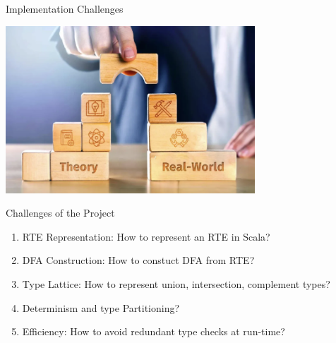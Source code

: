 {  
  \begin{frame}{Implementation Challenges}
      
  \centering
  \includegraphics[width=0.7\textwidth]{theoretic-challenge.png}
\end{frame}
}

\begin{frame}{Challenges of the Project}
  \begin{enumerate}
  \item RTE Representation:   How to represent an RTE in Scala?
  \item DFA Construction:  How to constuct DFA from RTE?
  \item Type Lattice: How to represent union, intersection, complement types?
  \item Determinism and type Partitioning?
  \item Efficiency:  How to avoid redundant type checks at run-time?
  \end{enumerate}
\end{frame}
